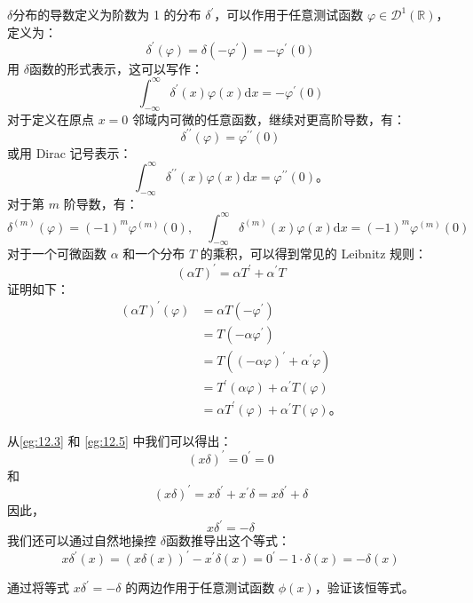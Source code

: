 \begin{eg}\label{eg:12.5} 
  $\delta$分布的导数定义为阶数为 1 的分布
$\delta^{\prime}$，可以作用于任意测试函数
$\varphi \in \mathcal{D}^1(\mathbb{R})$，定义为：
 $$
\delta^{\prime}(\varphi) = \delta\left(-\varphi^{\prime}\right) = -\varphi^{\prime}(0)
$$
用 $\delta$函数的形式表示，这可以写作：
 $$
\int_{-\infty}^\infty \delta^{\prime}(x) \varphi(x) \mathrm{d}x = -\varphi^{\prime}(0)
$$
对于定义在原点 $x=0$ 邻域内可微的任意函数，继续对更高阶导数，有：
 $$
\delta^{\prime\prime}(\varphi) = \varphi^{\prime\prime}(0)
$$
或用 Dirac 记号表示：
 $$
\int_{-\infty}^\infty \delta^{\prime\prime}(x) \varphi(x) \mathrm{d}x = \varphi^{\prime\prime}(0)。
$$
对于第 $m$ 阶导数，有：
 $$
\delta^{(m)}(\varphi) = (-1)^m \varphi^{(m)}(0), \quad \int_{-\infty}^\infty \delta^{(m)}(x) \varphi(x) \mathrm{d}x = (-1)^m \varphi^{(m)}(0)
$$
对于一个可微函数 $\alpha$ 和一个分布 $T$ 的乘积，可以得到常见的
Leibnitz 规则：
 $$
(\alpha T)^{\prime} = \alpha T^{\prime} + \alpha^{\prime} T
$$
证明如下：
 $$
\begin{aligned}
(\alpha T)^{\prime}(\varphi) & = \alpha T\left(-\varphi^{\prime}\right) \\
& = T\left(-\alpha \varphi^{\prime}\right) \\
& = T\left((-\alpha \varphi)^{\prime} + \alpha^{\prime} \varphi\right) \\
& = T^{\prime}(\alpha \varphi) + \alpha^{\prime} T(\varphi) \\
& = \alpha T^{\prime}(\varphi) + \alpha^{\prime} T(\varphi)。
\end{aligned}
$$
\end{eg}
\begin{eg}\label{eg:12.6} 
  从\ref{eg:12.3} 和 \ref{eg:12.5} 中我们可以得出：
$$
(x \delta)^{\prime} = 0^{\prime} = 0
$$
和
 $$
(x \delta)^{\prime} = x \delta^{\prime} + x^{\prime} \delta = x \delta^{\prime} + \delta
$$
因此，
 $$
x \delta^{\prime} = -\delta
$$
我们还可以通过自然地操控 $\delta$函数推导出这个等式：
 $$
x \delta^{\prime}(x) = (x \delta(x))^{\prime} - x^{\prime} \delta(x) = 0^{\prime} - 1 \cdot \delta(x) = -\delta(x)
$$
\end{eg}

\begin{exercise}
  通过将等式 $x \delta^{\prime} = -\delta$
  的两边作用于任意测试函数 $\phi(x)$，验证该恒等式。
\end{exercise}

